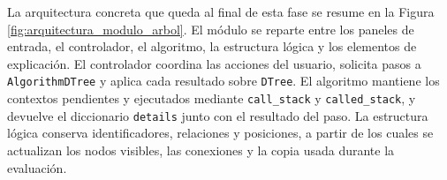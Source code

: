 La arquitectura concreta que queda al final de esta fase se resume en la Figura \ref{fig:arquitectura_modulo_arbol}.
El módulo se reparte entre los paneles de entrada, el controlador, el algoritmo, la estructura lógica y los elementos de explicación.
El controlador coordina las acciones del usuario, solicita pasos a \texttt{AlgorithmDTree} y aplica cada resultado sobre \texttt{DTree}.
El algoritmo mantiene los contextos pendientes y ejecutados mediante \texttt{call\_stack} y \texttt{called\_stack}, y devuelve el diccionario \texttt{details} junto con el resultado del paso.
La estructura lógica conserva identificadores, relaciones y posiciones, a partir de los cuales se actualizan los \gls{nodo}s visibles, las conexiones y la copia usada durante la evaluación.

%
